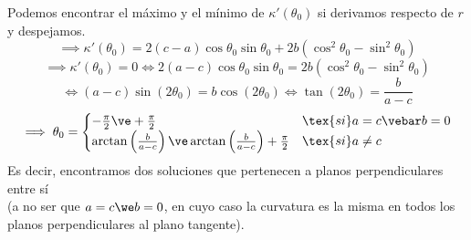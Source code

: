 Podemos encontrar el máximo y el mínimo de $\kappa'(\theta_0)$ si derivamos respecto de $r$ y despejamos.
\[\implies \kappa'(\theta_0) = 2(c - a)\cos\theta_0\sin\theta_0 + 2b(\cos^2\theta_0 - \sin^2\theta_0)\]
\[\implies \kappa'(\theta_0)=0 \iff 2(a-c)\cos\theta_0\sin\theta_0 = 2b(\cos^2\theta_0 - \sin^2\theta_0)\]
\[\iff (a-c)\sin(2\theta_0) = b\cos(2\theta_0) \iff \tan(2\theta_0) = \frac{b}{a-c}\]
\[\implies \theta_0 = \begin{cases}
		-\frac{\pi}{2} \ve +\frac{\pi}{2}                                                     & \tex{ si } a=c \vebar b=0 \\
		\arctan\left(\frac{b}{a-c}\right) \ve \arctan\left(\frac{b}{a-c}\right)+\frac{\pi}{2} & \tex{ si } a\neq c
	\end{cases}\]
Es decir, encontramos dos soluciones que pertenecen a planos perpendiculares entre sí \\(a no ser que $a=c \we b=0$, en cuyo caso la curvatura es la misma en todos los planos perpendiculares al plano tangente).
